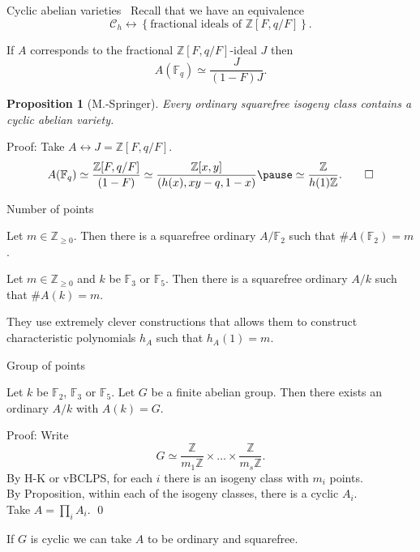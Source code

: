 \documentclass[usenames,dvipsnames,handout]{beamer}
\def\Z{\mathbb{Z}}
\def\F{\mathbb{F}}
\newcommand{\cC}{{\mathcal C}}
\newcommand{\set}[1]{\left\lbrace#1\right\rbrace }
\newtheorem{prop}[df]{Proposition}
\begin{document}
\begin{frame}{ Cyclic abelian varieties }\
    Recall that we have an equivalence
    \[ \cC_h \longleftrightarrow \set{\text{fractional ideals of $\Z[F,q/F]$}}. \]
    \pause
    \vspace{-0.5cm}
    \begin{corollary}
        If $A$ corresponds to the fractional $\Z[F,q/F]$-ideal $J$ then
    \pause
        \vspace{-0.2cm}
        \[ A(\F_q) \simeq \frac{J}{(1-F)J}.\]
    \end{corollary}
    \pause
    \begin{prop}[M.-Springer]
        Every ordinary squarefree isogeny class contains a cyclic abelian variety.
    \end{prop}
    \pause
	Proof: Take $A\longleftrightarrow J=\Z[F,q/F]$.
    \pause
    \[ A(\F_q)\simeq \frac{\Z[F,q/F]}{(1-F)} \simeq \frac{\Z[x,y]}{(h(x),xy-q,1-x)}
    \pause
    \simeq \frac{\Z}{h(1)\Z}.\qed \]
\end{frame}

\begin{frame}{ Number of points }
    \begin{theorem}
        Let $m\in\Z_{\geq 0}$. Then there is a squarefree ordinary $A/\F_2$ such that $\#A(\F_2)=m$.
    \end{theorem}
    \pause
    \begin{theorem}
        Let $m\in\Z_{\geq 0}$ and $k$ be $\F_3$ or $\F_5$. Then there is a squarefree ordinary $A/k$ such that $\#A(k)=m$.
    \end{theorem}
    \pause
    They use extremely clever constructions that allows them to construct characteristic polynomials $h_A$ such that $h_A(1)=m$.
\end{frame}

\begin{frame}{ Group of points }
    \begin{theorem}[M.-Springer]
        Let $k$ be $\F_2$, $\F_3$ or $\F_5$. Let $G$ be a finite abelian group.
        \pause
        Then there exists an ordinary $A/k$ with $A(k) = G$.
    \end{theorem}
    \pause
    Proof: Write
    \[ G\simeq \frac{\Z}{m_1 \Z} \times \ldots \times \frac{\Z}{m_s \Z}.\]
    \pause
    By H-K or vBCLPS, for each $i$ there is an isogeny class with $m_i$ points.\\
    \pause
    By Proposition, within each of the isogeny classes, there is a cyclic $A_i$.\\
    \pause
    Take $A=\prod_i A_i$. \qed
    \pause
    \begin{corollary}
        If $G$ is cyclic we can take $A$ to be ordinary and squarefree.
    \end{corollary}
\end{frame}
\end{document}
